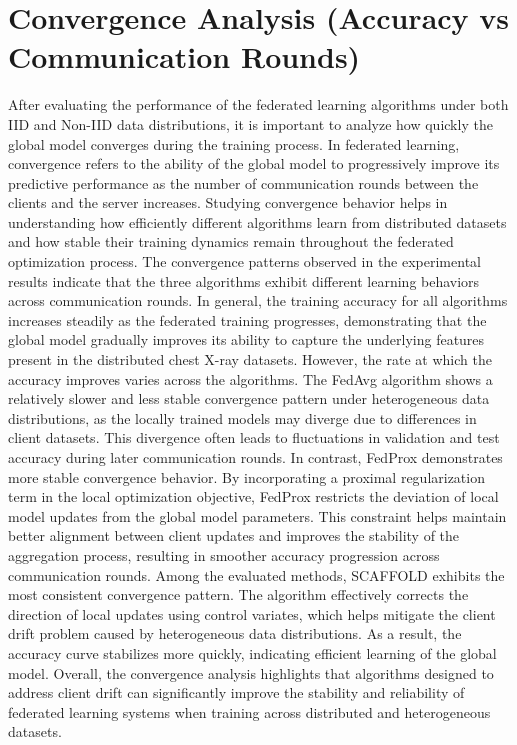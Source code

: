 \documentclass[12pt]{book}
\begin{document}
\section{Convergence Analysis (Accuracy vs Communication Rounds)}
After evaluating the performance of the federated learning algorithms under both IID and Non-IID data distributions, it is important to analyze how quickly the global model converges during the training process. In federated learning, convergence refers to the ability of the global model to progressively improve its predictive performance as the number of communication rounds between the clients and the server increases. Studying convergence behavior helps in understanding how efficiently different algorithms learn from distributed datasets and how stable their training dynamics remain throughout the federated optimization process.
The convergence patterns observed in the experimental results indicate that the three algorithms exhibit different learning behaviors across communication rounds. In general, the training accuracy for all algorithms increases steadily as the federated training progresses, demonstrating that the global model gradually improves its ability to capture the underlying features present in the distributed chest X-ray datasets.
However, the rate at which the accuracy improves varies across the algorithms. The FedAvg algorithm shows a relatively slower and less stable convergence pattern under heterogeneous data distributions, as the locally trained models may diverge due to differences in client datasets. This divergence often leads to fluctuations in validation and test accuracy during later communication rounds.
In contrast, FedProx demonstrates more stable convergence behavior. By incorporating a proximal regularization term in the local optimization objective, FedProx restricts the deviation of local model updates from the global model parameters. This constraint helps maintain better alignment between client updates and improves the stability of the aggregation process, resulting in smoother accuracy progression across communication rounds.
Among the evaluated methods, SCAFFOLD exhibits the most consistent convergence pattern. The algorithm effectively corrects the direction of local updates using control variates, which helps mitigate the client drift problem caused by heterogeneous data distributions. As a result, the accuracy curve stabilizes more quickly, indicating efficient learning of the global model.
Overall, the convergence analysis highlights that algorithms designed to address client drift can significantly improve the stability and reliability of federated learning systems when training across distributed and heterogeneous datasets.
\end{document}
